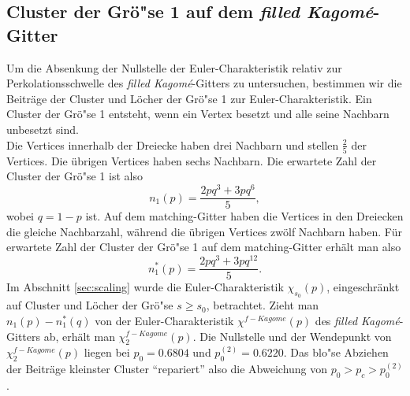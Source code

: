 \subsection*{Cluster der Gr\"o"se 1 auf dem \textit{filled Kagom\'e}-Gitter}
Um die Absenkung der Nullstelle der Euler-Charakteristik relativ zur Perkolationsschwelle des \textit{filled Kagom\'e}-Gitters zu untersuchen, bestimmen wir die Beitr\"age der Cluster und L\"ocher der Gr\"o"se 1 zur Euler-Charakteristik. Ein Cluster der Gr\"o"se 1 entsteht, wenn ein Vertex besetzt und alle seine Nachbarn unbesetzt sind. 
\\Die Vertices innerhalb der Dreiecke haben drei Nachbarn und stellen $\frac{2}{5}$ der Vertices. Die \"ubrigen Vertices haben sechs Nachbarn. Die erwartete Zahl der Cluster der Gr\"o"se 1 ist also
\begin{equation}
  n_1(p)=\frac{2pq^3+3pq^6}{5},
\end{equation}
wobei $q=1-p$ ist. Auf dem matching-Gitter haben die Vertices in den Dreiecken die gleiche Nachbarzahl, w\"ahrend die \"ubrigen Vertices zw\"olf Nachbarn haben. F\"ur erwartete Zahl der Cluster der Gr\"o"se 1 auf dem matching-Gitter erh\"alt man also
\begin{equation}
  n_1^*(p)=\frac{2pq^3+3pq^{12}}{5}.
\end{equation}
Im Abschnitt \ref{sec:scaling} wurde die Euler-Charakteristik $\chi_{s_0}(p)$, eingeschr\"ankt auf Cluster und L\"ocher der Gr\"o"se $s\geq s_0$, betrachtet. Zieht man $n_1(p)-n_1^*(q)$ von der Euler-Charakteristik $\chi^{f-Kagome}(p)$ des \textit{filled Kagom\'e}-Gitters ab, erh\"alt man $\chi^{f-Kagome}_2(p)$. Die Nullstelle und der Wendepunkt von $\chi^{f-Kagome}_2(p)$ liegen bei $p_0=0.6804$ und $p_0^{(2)}=0.6220$. Das blo"se Abziehen der Beitr\"age kleinster Cluster ``repariert'' also die Abweichung von $p_0>p_c>p_0^{(2)}$.

